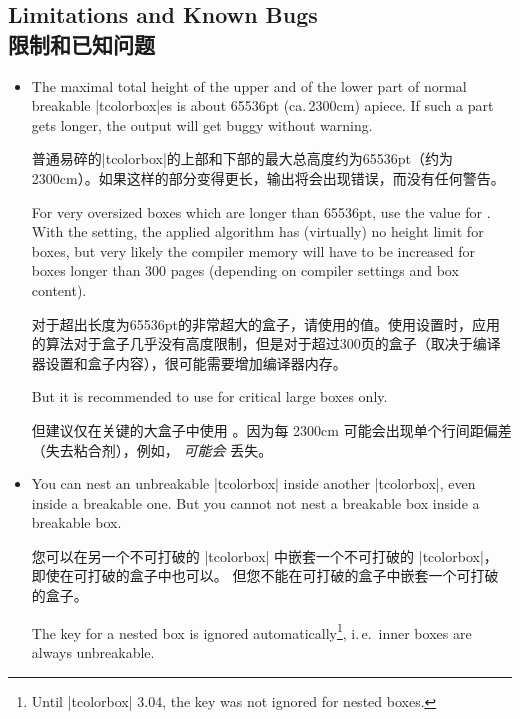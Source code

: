 \subsection{Limitations and Known Bugs\\限制和已知问题}
\begin{itemize}
\item  The maximal total height of the upper and of the lower part
of normal breakable |tcolorbox|es is about 65536pt (ca.\,2300cm)
apiece. If such a part gets longer, the output will get buggy
without warning.

普通易碎的|tcolorbox|的上部和下部的最大总高度约为65536pt（约为2300cm）。如果这样的部分变得更长，输出将会出现错误，而没有任何警告。

For very oversized boxes which are longer than 65536pt, use
the  value for  .
With the  setting,
the applied algorithm has (virtually) no height limit for boxes, but
very likely the compiler memory will have to be increased for boxes longer
than 300 pages (depending on compiler settings and box content).

对于超出长度为65536pt的非常超大的盒子，请使用的值。使用设置时，应用的算法对于盒子几乎没有高度限制，但是对于超过300页的盒子（取决于编译器设置和盒子内容），很可能需要增加编译器内存。

But it is recommended to use  for critical large boxes only.

但建议仅在关键的大盒子中使用 。因为每 2300cm 可能会出现单个行间距偏差（失去粘合剂），例如， \emph{可能会} 丢失。

\item You can nest an unbreakable |tcolorbox| inside another |tcolorbox|,
even inside a breakable one.
But you cannot not nest a breakable box inside a breakable box.

您可以在另一个不可打破的 |tcolorbox| 中嵌套一个不可打破的 |tcolorbox|， 即使在可打破的盒子中也可以。 但您不能在可打破的盒子中嵌套一个可打破的盒子。

The  key for a nested box is ignored
automatically\footnote{Until |tcolorbox| 3.04, the  key
was not ignored for nested boxes.}, i.\,e.\ inner
boxes are always unbreakable.


\end{itemize}
